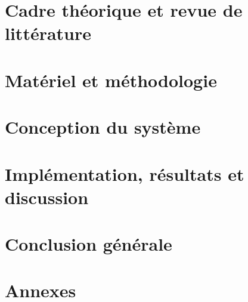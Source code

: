 \documentclass[a4paper,12pt,openany]{book}
\begin{document}
\chapter{Cadre théorique et revue de littérature}
\label{chap:cadre_theorique}


\chapter{Matériel et méthodologie}
\label{chap:materiel_methodologie}


\chapter{Conception du système}
\label{chap:conception_developpement}


\chapter{Implémentation, résultats et discussion}
\label{chap:resultats_discussion}


\chapter*{Conclusion générale}


\clearpage
{}
{}
\printbibliography

\chapter*{Annexes}

\end{document}
